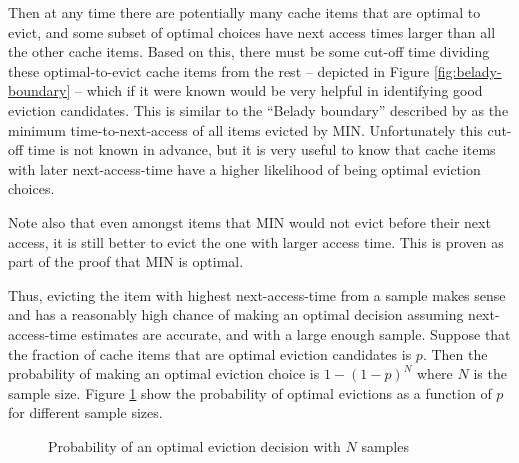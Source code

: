
Then at any time there are potentially many cache items that are optimal to evict, and some subset of optimal choices have next access times larger than all the other cache items. Based on this, there must be some cut-off time dividing these optimal-to-evict cache items from the rest -- depicted in Figure \ref{fig:belady-boundary} -- which if it were known would be very helpful in identifying good eviction candidates. This is similar to the ``Belady boundary'' described by \citet{relaxedBelady} as the minimum time-to-next-access of all items evicted by MIN. Unfortunately this cut-off time is not known in advance, but it is very useful to know that cache items with later next-access-time have a higher likelihood of being optimal eviction choices. 

Note also that even amongst items that MIN would not evict before their next access, it is still better to evict the one with larger access time. This is proven as part of the proof that MIN is optimal.~\cite{MINOptimality} %

Thus, evicting the item with highest next-access-time from a sample makes sense and has a reasonably high chance of making an optimal decision assuming next-access-time estimates are accurate, and with a large enough sample. Suppose that the fraction of cache items that are optimal eviction candidates is $p$. Then the probability of making an optimal eviction choice is $1-(1-p)^N$ where $N$ is the sample size. Figure \ref{plot:P-opt-eviction} show the probability of optimal evictions as a function of $p$ for different sample sizes.

\begin{figure}
    \centering
    \caption[PBM-sampling probability of optimal decision]{Probability of an optimal eviction decision with $N$ samples}
    \label{plot:P-opt-eviction}
\end{figure}



